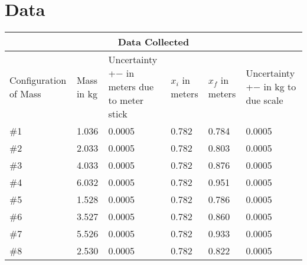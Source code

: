 {}
\chapter{Data}

\begin{tabular}{ |p{2cm}|p{2cm}|p{4cm}|p{2cm}|p{2cm}|p{2cm}| }
  \hline
  \multicolumn{6}{|c|}{Data Collected} \\
  \hline
  Configuration of Mass & Mass in kg & Uncertainty +$-$ in meters due to meter stick
  & $x_i$ in meters & $x_f$ in meters & Uncertainty +$-$ in kg to due scale\\
  \hline
  \#1& 1.036 &  0.0005 & 0.782 & 0.784 & 0.0005\\
  \hline
  \#2& 2.033 &  0.0005 & 0.782 & 0.803 & 0.0005\\
  \hline
  \#3& 4.033 &  0.0005 & 0.782 & 0.876 & 0.0005\\
  \hline
  \#4& 6.032 &  0.0005 & 0.782 & 0.951 & 0.0005\\
  \hline
  \#5& 1.528 &  0.0005 & 0.782 & 0.786 & 0.0005\\
  \hline
  \#6& 3.527 &  0.0005 & 0.782 & 0.860 & 0.0005\\
  \hline
  \#7& 5.526 &  0.0005 & 0.782 & 0.933 & 0.0005\\
  \hline
  \#8& 2.530 &  0.0005 & 0.782 & 0.822 & 0.0005\\
  \hline
\end{tabular}

\restoregeometry